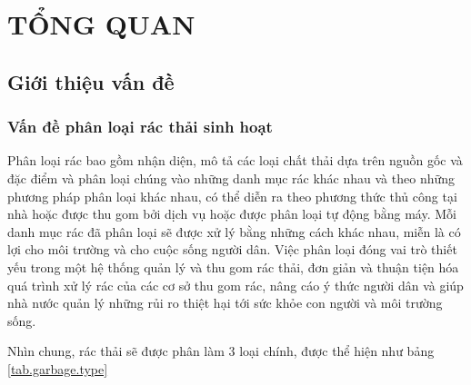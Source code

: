 
\chapter{TỔNG QUAN}
\section{Giới thiệu vấn đề}
\subsection{Vấn đề phân loại rác thải sinh hoạt}
Phân loại rác bao gồm nhận diện, mô tả các loại chất thải dựa trên nguồn gốc và đặc điểm và phân loại chúng vào những danh mục rác khác nhau và theo những phương pháp phân loại khác nhau, có thể diễn ra theo phương thức thủ công tại nhà hoặc được thu gom bởi dịch vụ hoặc được phân loại tự động bằng máy. Mỗi danh mục rác đã phân loại sẽ được xử lý bằng những cách khác nhau, miễn là có lợi cho môi trường và cho cuộc sống người dân. Việc phân loại đóng vai trò thiết yếu trong một hệ thống quản lý và thu gom rác thải, đơn giản và thuận tiện hóa quá trình xử lý rác của các cơ sở thu gom rác, nâng cáo ý thức người dân và giúp nhà nước quản lý những rủi ro thiệt hại tới sức khỏe con người và môi trường sống.

Nhìn chung, rác thải sẽ được phân làm 3 loại chính, được thể hiện như bảng \ref{tab.garbage.type}

